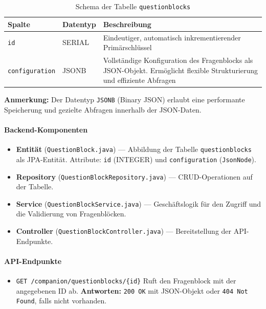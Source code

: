 \documentclass[12pt,a4paper]{report}
\begin{document}
    \begin{table}[!htbp]
        \centering
        \begin{tabular}{|l|l|p{9cm}|}
            \hline
                \textbf{Spalte} & \textbf{Datentyp} & \textbf{Beschreibung} \\
            \hline
                \texttt{id} & SERIAL & Eindeutiger, automatisch inkrementierender Primärschlüssel \\
                \texttt{configuration} & JSONB & Vollständige Konfiguration des Fragenblocks als JSON-Objekt.
                Ermöglicht flexible Strukturierung und effiziente Abfragen \\
            \hline
        \end{tabular}
        \caption{Schema der Tabelle \texttt{questionblocks}}
        \label{tab:questionblocks_schema}
    \end{table}

    \noindent
    \textbf{Anmerkung:} Der Datentyp \texttt{JSONB} (Binary JSON) erlaubt eine performante Speicherung und gezielte Abfragen innerhalb der JSON-Daten.

\paragraph{Backend-Komponenten}
    \begin{itemize}
        \item \textbf{Entität} (\texttt{QuestionBlock.java}) — Abbildung der Tabelle \texttt{questionblocks} als JPA-Entität.
            Attribute: \texttt{id} (INTEGER) und \texttt{configuration} (\texttt{JsonNode}).
        \item \textbf{Repository} (\texttt{QuestionBlockRepository.java}) — CRUD-Operationen auf der Tabelle.
        \item \textbf{Service} (\texttt{QuestionBlockService.java}) — Geschäftslogik für den Zugriff und die Validierung von Fragenblöcken.
        \item \textbf{Controller} (\texttt{QuestionBlockController.java}) — Bereitstellung der API-Endpunkte.
    \end{itemize}

\paragraph{API-Endpunkte}
    \begin{itemize}
        \item \texttt{GET /companion/questionblocks/\{id\}}
            Ruft den Fragenblock mit der angegebenen ID ab.
            \textbf{Antworten:} \texttt{200 OK} mit JSON-Objekt oder \texttt{404 Not Found}, falls nicht vorhanden.
    \end{itemize}
\end{document}
